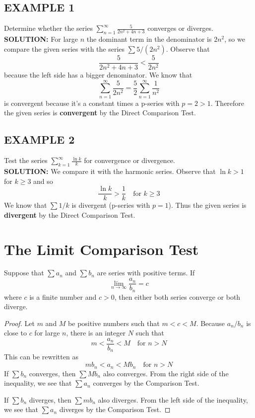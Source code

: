 \documentclass{article}
\theoremstyle{mystyle}
\begin{document}
\subsection*{EXAMPLE 1}
Determine whether the series \( \sum_{n=1}^{\infty} \frac{5}{2n^2 + 4n + 3} \) converges or diverges.\\
\textbf{SOLUTION:}
For large $n$ the dominant term in the denominator is $2n^2$, so we compare the given series with the series $\sum 5/(2n^2)$. Observe that
\[ \frac{5}{2n^2 + 4n + 3} < \frac{5}{2n^2} \]
because the left side has a bigger denominator. We know that
\[ \sum_{n=1}^{\infty} \frac{5}{2n^2} = \frac{5}{2} \sum_{n=1}^{\infty} \frac{1}{n^2} \]
is convergent because it's a constant times a p-series with $p = 2 > 1$. Therefore the given series is \textbf{convergent} by the Direct Comparison Test.

\subsection*{EXAMPLE 2}
Test the series \( \sum_{k=1}^{\infty} \frac{\ln k}{k} \) for convergence or divergence.\\
\textbf{SOLUTION:}
We compare it with the harmonic series. Observe that $\ln k > 1$ for $k \ge 3$ and so
\[ \frac{\ln k}{k} > \frac{1}{k} \quad \text{for } k \ge 3 \]
We know that $\sum 1/k$ is divergent (p-series with $p=1$). Thus the given series is \textbf{divergent} by the Direct Comparison Test.

\section*{The Limit Comparison Test}
\begin{tcolorbox}[
    colback=white,
    colframe=orange!80!white,
    title=The Limit Comparison Test,
    boxrule=0.5mm,
    arc=3mm
    ]
    Suppose that \( \sum a_n \) and \( \sum b_n \) are series with positive terms. If
    \[ \lim_{n \to \infty} \frac{a_n}{b_n} = c \]
    where \( c \) is a finite number and \( c > 0 \), then either both series converge or both diverge.
\end{tcolorbox}

\begin{proof}
  Let \(m\) and \(M\) be positive numbers such that \(m < c < M\). Because \(a_n/b_n\) is close to \(c\) for large \(n\), there is an integer \(N\) such that
  \[ m < \dfrac{a_n}{b_n} < M \quad \text{for } n > N \]
  This can be rewritten as
  \[ mb_n < a_n < Mb_n \quad \text{for } n > N \]
  If \( \sum b_n \) converges, then \( \sum Mb_n \) also converges. From the right side of the inequality, we see that \( \sum a_n \) converges by the Comparison Test.
  
  If \( \sum b_n \) diverges, then \( \sum mb_n \) also diverges. From the left side of the inequality, we see that \( \sum a_n \) diverges by the Comparison Test.
  \end{proof}
\end{document}
